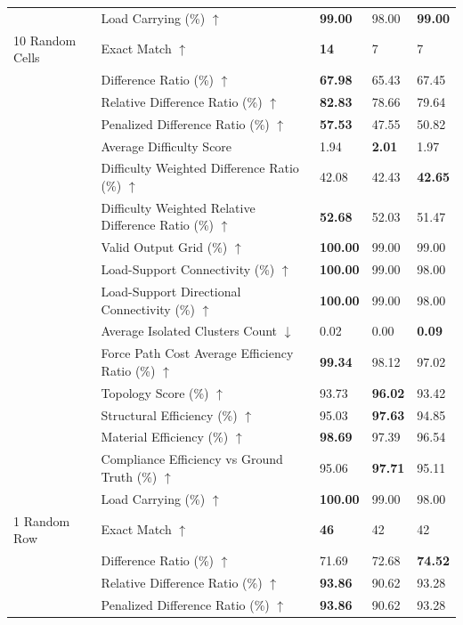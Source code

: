 \begin{table}[!h]
{\begin{tabular}{lllll}
 & Load Carrying (\%) $\uparrow$ & \textbf{99.00} & 98.00 & \textbf{99.00} \\
10 Random Cells & Exact Match $\uparrow$ & \textbf{14} & 7 & 7 \\
 & Difference Ratio (\%) $\uparrow$ & \textbf{67.98} & 65.43 & 67.45 \\
 & Relative Difference Ratio (\%) $\uparrow$ & \textbf{82.83} & 78.66 & 79.64 \\
 & Penalized Difference Ratio (\%) $\uparrow$ & \textbf{57.53} & 47.55 & 50.82 \\
 & Average Difficulty Score & 1.94 & \textbf{2.01} & 1.97 \\
 & Difficulty Weighted Difference Ratio (\%) $\uparrow$ & 42.08 & 42.43 & \textbf{42.65} \\
 & Difficulty Weighted Relative Difference Ratio (\%) $\uparrow$ & \textbf{52.68} & 52.03 & 51.47 \\
 & Valid Output Grid (\%) $\uparrow$ & \textbf{100.00} & 99.00 & 99.00 \\
 & Load-Support Connectivity (\%) $\uparrow$ & \textbf{100.00} & 99.00 & 98.00 \\
 & Load-Support Directional Connectivity (\%) $\uparrow$ & \textbf{100.00} & 99.00 & 98.00 \\
 & Average Isolated Clusters Count $\downarrow$ & 0.02 & 0.00 & \textbf{0.09} \\
 & Force Path Cost Average Efficiency Ratio (\%) $\uparrow$ & \textbf{99.34} & 98.12 & 97.02 \\
 & Topology Score (\%) $\uparrow$ & 93.73 & \textbf{96.02} & 93.42 \\
 & Structural Efficiency (\%) $\uparrow$ & 95.03 & \textbf{97.63} & 94.85 \\
 & Material Efficiency (\%) $\uparrow$ & \textbf{98.69} & 97.39 & 96.54 \\
 & Compliance Efficiency vs Ground Truth (\%) $\uparrow$ & 95.06 & \textbf{97.71} & 95.11 \\
 & Load Carrying (\%) $\uparrow$ & \textbf{100.00} & 99.00 & 98.00 \\
1 Random Row & Exact Match $\uparrow$ & \textbf{46} & 42 & 42 \\
 & Difference Ratio (\%) $\uparrow$ & 71.69 & 72.68 & \textbf{74.52} \\
 & Relative Difference Ratio (\%) $\uparrow$ & \textbf{93.86} & 90.62 & 93.28 \\
 & Penalized Difference Ratio (\%) $\uparrow$ & \textbf{93.86} & 90.62 & 93.28 \\

\end{tabular}}
\end{table}
